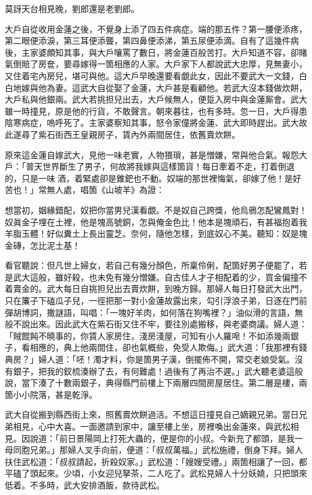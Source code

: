 \begin{myquote}
莫訝天台相見晚，劉郎還是老劉郎。{}
\end{myquote}

大戶自從收用金蓮之後，不覺身上添了四五件病症。{}端的那五件？第一腰便添疼，第二眼便添淚，第三耳便添聾，第四鼻便添涕，第五尿便添滴。自有了這幾件病後，主家婆頗知其事，與大戶嚷罵了數日，將金蓮百般苦打。大戶知道不容，卻賭氣倒賠了房奩，要尋嫁得一箇相應的人家。大戶家下人都說武大忠厚，見無妻小，又住着宅內房兒，堪可與他。這大戶早晚還要看覷此女，{}因此不要武大一文錢，白白地嫁與他為妻。這武大自從娶了金蓮，大戶甚是看顧他。若武大沒本錢做炊餅，大戶私與他銀兩。武大若挑担兒出去，大戶候無人，便踅入房中與金蓮厮會。武大雖一時撞見，原是他的行貨，不敢聲言。朝來暮往，也有多時。忽一日，大戶得患陰寒病症，嗚呼死了。主家婆察知其事，怒令家僮將金蓮、武大即時趕出。武大故此遂尋了紫石街西王皇親房子，賃內外兩間居住，依舊賣炊餅。

原來這金蓮自嫁武大，見他一味老實，人物猥瑣，甚是憎嫌，{}常與他合氣。報怨大戶：「普天世界斷生了男子，何故將我嫁與這樣箇貨！每日牽着不走，打着倒退的，只是一味𠳹酒，着緊處卻是錐鈀也不動。奴端的那世裡悔氣，卻嫁了他！是好苦也！」常無人處，唱箇《山坡羊》為證：

\begin{myquote}
想當初，姻緣錯配，奴把你當男兒漢看覷。不是奴自己誇獎，他烏鴉怎配鸞鳳對！奴眞金子埋在土裡，他是塊高號銅，怎與俺金色比！他本是塊頑石，有甚福抱着我羊脂玉體！好似糞土上長出靈芝。奈何，隨他怎樣，到底奴心不美。聽知：奴是塊金磚，怎比泥土基！
\end{myquote}

看官聽說：但凡世上婦女，若自己有幾分顏色，所稟伶俐，配箇好男子便罷了，若是武大這般，雖好殺，也未免有幾分憎嫌。{}自古佳人才子相配着的少，買金偏撞不着賣金的。武大每日自挑担兒出去賣炊餅，到晚方歸。那婦人每日打發武大出門，只在簾子下磕瓜子兒，{}一徑把那一對小金蓮故露出來，勾引浮浪子弟，日逐在門前彈胡博詞，撒謎語，叫唱：「一塊好羊肉，如何落在狗嘴裡？」油似滑的言語，無般不說出來。因此武大在紫石街又住不牢，要往別處搬移，與老婆商議。婦人道：「賊餛飩不曉事的，你賃人家房住，淺房淺屋，可知有小人羅唣！不如添幾兩銀子，看相應的，典上他兩間住，卻也氣概些，免受人欺侮。」武大道：「我那裡有錢典房？」婦人道：「呸！濁才料，你是箇男子漢，倒擺佈不開，常交老娘受氣。沒有銀子，把我的釵梳湊辦了去，有何難處！過後有了再治不遲。」{}武大聽老婆這般說，當下湊了十數兩銀子，典得縣門前樓上下兩層四間房屋居住。第二層是樓，兩箇小小院落，甚是乾淨。

武大自從搬到縣西街上來，照舊賣炊餅過活。不想這日撞見自己嫡親兄弟。當日兄弟相見，心中大喜。一面邀請到家中，讓至樓上坐，房裡喚出金蓮來，與武松相見。因說道：「前日景陽岡上打死大蟲的，便是你的小叔。{}今新充了都頭，是我一母同胞兄弟。」{}那婦人叉手向前，便道：「叔叔萬福。」武松施禮，倒身下拜。婦人扶住武松道：「叔叔請起，折殺奴家。」武松道：「嫂嫂受禮。」兩箇相讓了一回，都平磕了頭起來。少頃，小女迎兒拏茶，二人吃了。武松見婦人十分妖嬈，只把頭來低着。{}不多時，武大安排酒飯，款待武松。

